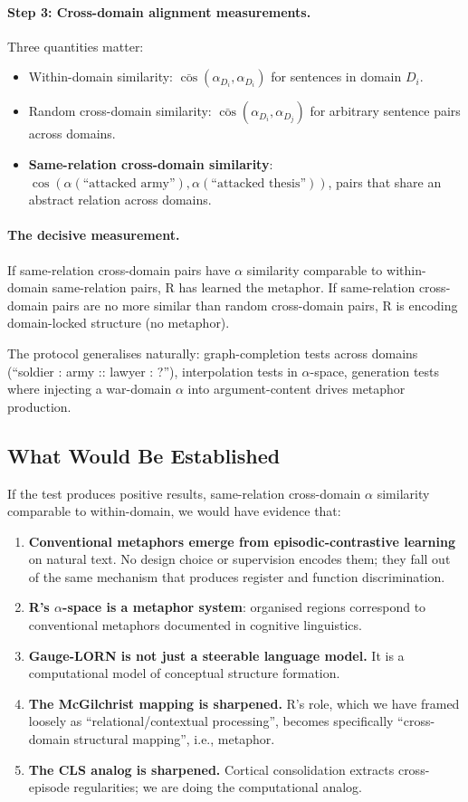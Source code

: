 \documentclass[11pt, a4paper]{article}
\theoremstyle{plain}
\theoremstyle{definition}
\theoremstyle{remark}
\begin{document}
\paragraph{Step 3: Cross-domain alignment measurements.}
Three quantities matter:
\begin{itemize}[nosep]
\item Within-domain similarity: $\bar{\cos}(\alpha_{D_i}, \alpha_{D_i})$ for sentences in domain $D_i$.
\item Random cross-domain similarity: $\bar{\cos}(\alpha_{D_i}, \alpha_{D_j})$ for arbitrary sentence pairs across domains.
\item \textbf{Same-relation cross-domain similarity}: $\cos(\alpha(\text{``attacked army''}), \alpha(\text{``attacked thesis''}))$, pairs that share an abstract relation across domains.
\end{itemize}

\paragraph{The decisive measurement.}
If same-relation cross-domain pairs have $\alpha$ similarity comparable to within-domain same-relation pairs, R has learned the metaphor.
If same-relation cross-domain pairs are no more similar than random cross-domain pairs, R is encoding domain-locked structure (no metaphor).

The protocol generalises naturally: graph-completion tests across domains (``soldier : army :: lawyer : ?''), interpolation tests in $\alpha$-space, generation tests where injecting a war-domain $\alpha$ into argument-content drives metaphor production.

\subsection{What Would Be Established}

If the test produces positive results, same-relation cross-domain $\alpha$ similarity comparable to within-domain, we would have evidence that:

\begin{enumerate}[nosep]
\item \textbf{Conventional metaphors emerge from episodic-contrastive learning} on natural text. No design choice or supervision encodes them; they fall out of the same mechanism that produces register and function discrimination.
\item \textbf{R's $\alpha$-space is a metaphor system}: organised regions correspond to conventional metaphors documented in cognitive linguistics.
\item \textbf{Gauge-LORN is not just a steerable language model.} It is a computational model of conceptual structure formation.
\item \textbf{The McGilchrist mapping is sharpened.} R's role, which we have framed loosely as ``relational/contextual processing'', becomes specifically ``cross-domain structural mapping'', i.e., metaphor.
\item \textbf{The CLS analog is sharpened.} Cortical consolidation extracts cross-episode regularities; we are doing the computational analog.
\end{enumerate}
\end{document}
